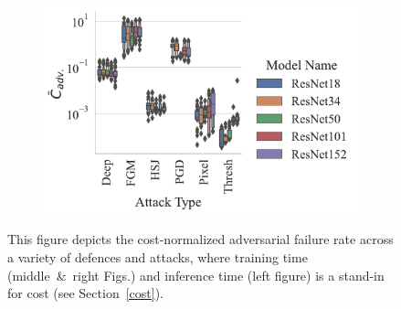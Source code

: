 \begin{figure}
\begin{subfigure}[]{0.3\textwidth}
        \centering
    \end{subfigure}
    \begin{subfigure}[]{0.35\textwidth}
        \includegraphics[width=\textwidth]{mnist/adv_failures_per_train_time_vs_attack_type.pdf}
        \centering
    \end{subfigure}
    \caption{This figure depicts the cost-normalized adversarial failure rate across a variety of defences and attacks, where training time (middle~\&~right Figs.) and inference time (left figure) is a stand-in for cost (see Section~\ref{cost}).}
    \label{fig:mnist_failures_per_train_time}
\end{figure}

